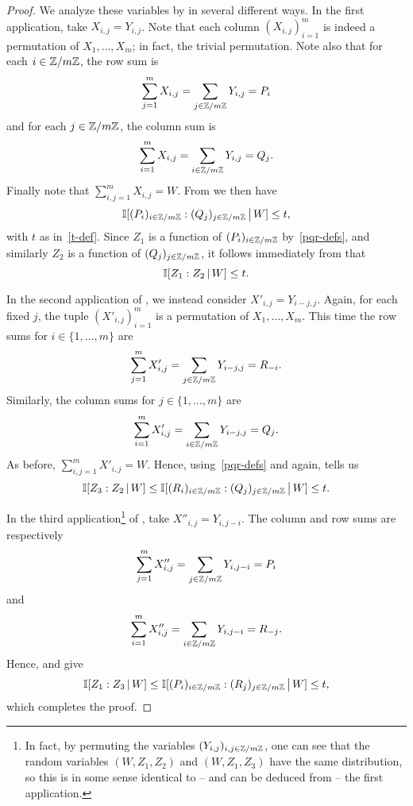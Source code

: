 \begin{proof}
  We analyze these variables by  in several different ways.
  In the first application, take $X_{i,j}=Y_{i,j}$.
  Note that each column $(X_{i,j})_{i=1}^m$ is indeed a permutation of $X_1,\dots,X_m$; in fact, the trivial permutation.
  Note also that for each $i \in \mathbb{Z}/m\mathbb{Z}$, the row sum is
  \[
    \sum_{j=1}^m X_{i,j} = \sum_{j \in \mathbb{Z}/m\mathbb{Z}} Y_{i,j} = P_i
  \]
  and for each $j \in \mathbb{Z}/m\mathbb{Z}$, the column sum is
  \[
    \sum_{i=1}^m X_{i,j} = \sum_{i \in \mathbb{Z}/m\mathbb{Z}} Y_{i,j} = Q_j.
  \]
  Finally note that $\sum_{i,j=1}^m X_{i,j} = W$.
  From  we then have
  \[
    \mathbb{I}[ (P_i)_{i \in \mathbb{Z}/m\mathbb{Z}} : (Q_j)_{j \in \mathbb{Z}/m\mathbb{Z} } \,\big|\, W ] \leq t,
  \]
  with $t$ as in~\eqref{t-def}.
  Since $Z_1$ is a function of $(P_i)_{i \in \mathbb{Z}/m\mathbb{Z}}$ by~\eqref{pqr-defs}, and similarly $Z_2$ is a function of $(Q_j)_{j \in \mathbb{Z}/m\mathbb{Z}}$, it follows immediately from  that
  \[
    \mathbb{I}[ Z_1 : Z_2 \,|\, W ] \leq t.
  \]

  In the second application of , we instead consider $X'_{i,j} = Y_{i-j,j}$.
  Again, for each fixed $j$, the tuple $(X'_{i,j})_{i=1}^m$ is a permutation of $X_1,\dots,X_m$.
  This time the row sums for $i \in \{1,\dots, m\}$ are
  \[
    \sum_{j=1}^m X'_{i,j} = \sum_{j \in \mathbb{Z}/m\mathbb{Z}} Y_{i-j,j} = R_{-i}.
  \]
 Similarly, the column sums for $j \in \{1,\dots, m\}$ are
  \[
    \sum_{i=1}^m X'_{i,j} = \sum_{i \in \mathbb{Z}/m\mathbb{Z}} Y_{i-j,j} = Q_j.
  \]
  As before, $\sum_{i,j=1}^m X'_{i,j} = W$.
  Hence, using~\eqref{pqr-defs} and  again,  tells us
  \[
    \mathbb{I}[ Z_3 :  Z_2 \,|\, W] \leq \mathbb{I}[ (R_i)_{i \in \mathbb{Z}/m\mathbb{Z}} : (Q_j)_{j \in \mathbb{Z}/m\mathbb{Z} } \,\big|\, W ] \leq t.
  \]

  In the third application\footnote{In fact, by permuting the variables $(Y_{i,j})_{i,j \in \mathbb{Z}/m\mathbb{Z}}$, one can see that the random variables $(W, Z_1, Z_2)$ and $(W, Z_1, Z_3)$ have the same distribution, so this is in some sense identical to -- and can be deduced from -- the first application.} of , take $X''_{i,j} = Y_{i,j-i}$.
  The column and row sums are respectively
  \[
    \sum_{j=1}^m X''_{i,j} = \sum_{j \in \mathbb{Z}/m\mathbb{Z}} Y_{i,j-i} = P_i \] and
\[     \sum_{i=1}^m X''_{i,j} = \sum_{i \in \mathbb{Z}/m\mathbb{Z}} Y_{i,j-i} = R_{-j}.
  \]
  Hence,  and  give
  \[
    \mathbb{I}[ Z_1 : Z_3 \,|\, W] \leq \mathbb{I}[ (P_i)_{i \in \mathbb{Z}/m\mathbb{Z}} : (R_j)_{j \in \mathbb{Z}/m\mathbb{Z} } \,\big|\, W ] \leq t,
  \]
  which completes the proof.
\end{proof}

